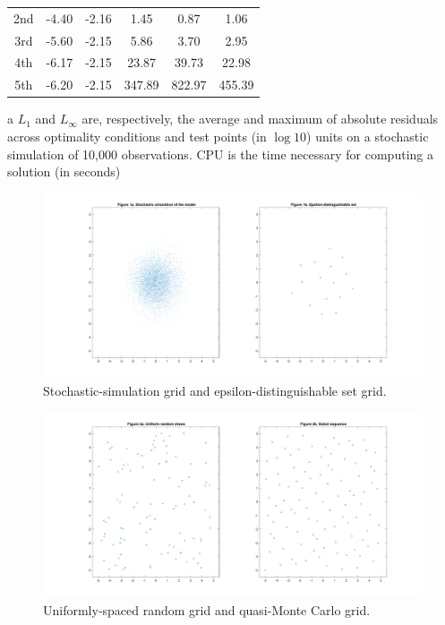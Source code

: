 \begin{table}[tph]
\begin{center}
\begin{threeparttable}
{\begin{tabular}{c|cc|ccc}
          2nd    & -4.40 &  -2.16 &           1.45 &            0.87 &            1.06 \\
          3rd    & -5.60 &  -2.15 &           5.86 &            3.70 &            2.95 \\
          4th    & -6.17 &  -2.15 &          23.87 &           39.73 &           22.98 \\
          5th    & -6.20 &  -2.15 &         347.89 &          822.97 &          455.39 \\ \hline
        \end{tabular}
        \begin{tablenotes}
          \item[a] $L_1$ and $L_\infty$ are, respectively, the average and maximum of
          absolute residuals across optimality conditions and test points (in $\log
          10$) units on a stochastic simulation of 10,000 observations. CPU is the time
          necessary for computing a solution (in seconds)
        \end{tablenotes}
      }
    \end{threeparttable}
  \end{center}
\end{table}

\begin{figure}
  \includegraphics[width=\textwidth]{images/CLMM/Figure1-eps-converted-to.pdf}
  \caption{Stochastic-simulation grid and epsilon-distinguishable set grid. }
  \label{fig:eps_dist_grid}
\end{figure}

\begin{figure}
  \includegraphics[width=\textwidth]{images/CLMM/Figure2-eps-converted-to.pdf}
  \caption{Uniformly-spaced random grid and quasi-Monte Carlo grid.}
  \label{fig:rand_sobol_grid}
\end{figure}
